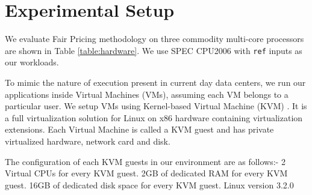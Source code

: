 \documentclass[pageno]{jpaper}
\begin{document}
\section{Experimental Setup}
\label{sec:ExperimentalSetup}
\begin{table}[ht]
\caption{Machine Specification in our experimental results} %
\centering %
\label{table:hardware} %
\end{table}

We evaluate Fair Pricing methodology on three commodity multi-core processors are shown in Table \ref{table:hardware}.  We use SPEC CPU2006 \cite{Henning:2006:SCB:1186736.1186737} with \texttt{ref} inputs as our workloads. 

To mimic the nature of execution present in current day data centers, we run our applications inside Virtual Machines (VMs), assuming each VM belongs to a particular user. We setup VMs using Kernel-based Virtual Machine (KVM) \cite{Qumranet2007} \cite{Bellard:2005:QFP:1247360.1247401}. It is a full virtualization solution for Linux on x86 hardware containing virtualization extensions. Each Virtual Machine is called a KVM guest and has private virtualized hardware, network card and disk.

The configuration of each KVM guests in our environment are as follows:-
2 Virtual CPUs for every KVM guest.
2GB of dedicated RAM for every KVM guest.
16GB of dedicated disk space for every KVM guest.
Linux version 3.2.0
\end{document}
